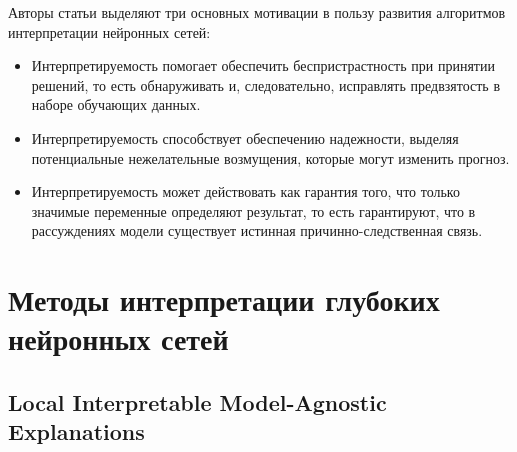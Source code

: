 \documentclass[oneside,final,14pt]{extreport}
\begin{document}
Авторы статьи \cite{1602.04938} выделяют три основных мотивации в пользу развития алгоритмов интерпретации нейронных сетей:
\begin{itemize}
\item Интерпретируемость помогает обеспечить беспристрастность при принятии решений, то есть обнаруживать и, следовательно, исправлять предвзятость в наборе обучающих данных.
\item Интерпретируемость способствует обеспечению надежности, выделяя потенциальные нежелательные возмущения, которые могут изменить прогноз.
\item Интерпретируемость может действовать как гарантия того, что только значимые переменные определяют результат, то есть гарантируют, что в рассуждениях модели существует истинная причинно-следственная связь.
\end{itemize}


\section{Методы интерпретации глубоких нейронных сетей}
\subsection{Local Interpretable Model-Agnostic Explanations}
\end{document}
